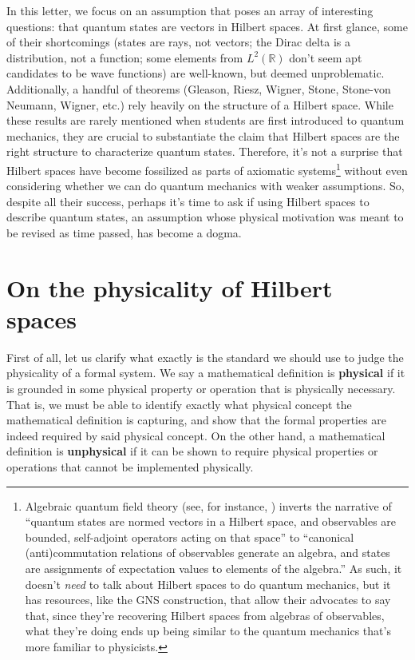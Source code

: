 \documentclass[10pt,twocolumn, nofootinbib]{revtex4-2}
\begin{document}
In this letter, we focus on an assumption that poses an array of interesting questions: that quantum states are vectors in Hilbert spaces. At first glance, some of their shortcomings (states are rays, not vectors; the Dirac delta is a distribution, not a function; some elements from $L^2(\mathbb{R})$ don't seem apt candidates to be wave functions) are well-known, but deemed unproblematic. Additionally, a handful of theorems (Gleason, Riesz, Wigner, Stone, Stone-von Neumann, Wigner, etc.) rely heavily on the structure of a Hilbert space. While these results are rarely mentioned when students are first introduced to quantum mechanics, they are crucial to substantiate the claim that Hilbert spaces are the right structure to characterize quantum states. Therefore, it's not a surprise that Hilbert spaces have become fossilized as parts of axiomatic systems\footnote{Algebraic quantum field theory (see, for instance, \citep{haag_local_1996}) inverts the narrative of ``quantum states are normed vectors in a Hilbert space, and observables are bounded, self-adjoint operators acting on that space'' to ``canonical (anti)commutation relations of observables generate an algebra, and states are assignments of expectation values to elements of the algebra.'' As such, it doesn't \textit{need} to talk about Hilbert spaces to do quantum mechanics, but it has resources, like the GNS construction, that allow their advocates to say that, since they're recovering Hilbert spaces from algebras of observables, what they're doing ends up being similar to the quantum mechanics that's more familiar to physicists.} without even considering whether we can do quantum mechanics with weaker assumptions. So, despite all their success, perhaps it's time to ask if using Hilbert spaces to describe quantum states, an assumption whose physical motivation was meant to be revised as time passed, has become a dogma.

\section{On the physicality of Hilbert spaces}

First of all, let us clarify what exactly is the standard we should use to judge the physicality of a formal system. We say a mathematical definition is \textbf{physical} if it is grounded in some physical property or operation that is physically necessary. That is, we must be able to identify exactly what physical concept the mathematical definition is capturing, and show that the formal properties are indeed required by said physical concept. On the other hand, a mathematical definition is \textbf{unphysical} if it can be shown to require physical properties or operations that cannot be implemented physically.
\end{document}
